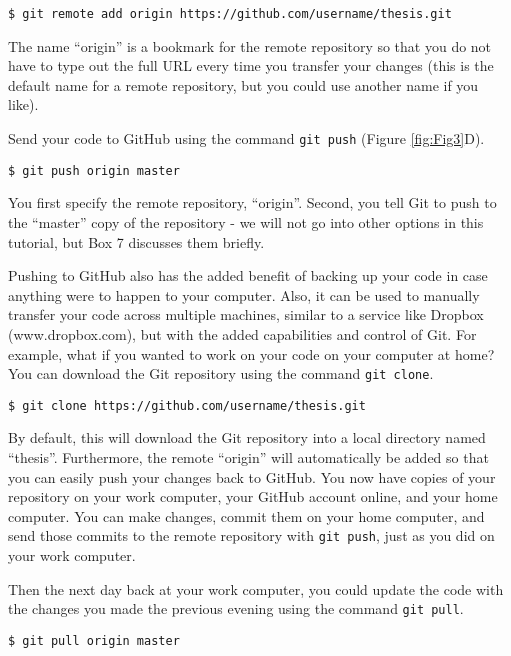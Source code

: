 \begin{verbatim}
$ git remote add origin https://github.com/username/thesis.git
\end{verbatim}

The name ``origin'' is a bookmark for the remote repository so that you do not have to type out the full URL every time you transfer your changes (this is the default name for a remote repository, but you could use another name if you like).

Send your code to GitHub using the command \verb|git push| (Figure \ref{fig:Fig3}D).

\begin{verbatim}
$ git push origin master
\end{verbatim}

You first specify the remote repository, ``origin''.
Second, you tell Git to push to the ``master'' copy of the repository - we will not go into other options in this tutorial, but Box 7 discusses them briefly.

Pushing to GitHub also has the added benefit of backing up your code in case anything were to happen to your computer.
Also, it can be used to manually transfer your code across multiple machines, similar to a service like Dropbox (www.dropbox.com), but with the added capabilities and control of Git.
For example, what if you wanted to work on your code on your computer at home?
You can download the Git repository using the command \verb|git clone|.

\begin{verbatim}
$ git clone https://github.com/username/thesis.git
\end{verbatim}

By default, this will download the Git repository into a local directory named ``thesis''.
Furthermore, the remote ``origin'' will automatically be added so that you can easily push your changes back to GitHub.
You now have copies of your repository on your work computer, your GitHub account online, and your home computer.
You can make changes, commit them on your home computer, and send those commits to the remote repository with \verb|git push|, just as you did on your work computer.

Then the next day back at your work computer, you could update the code with the changes you made the previous evening using the command \verb|git pull|.

\begin{verbatim}
$ git pull origin master
\end{verbatim}

